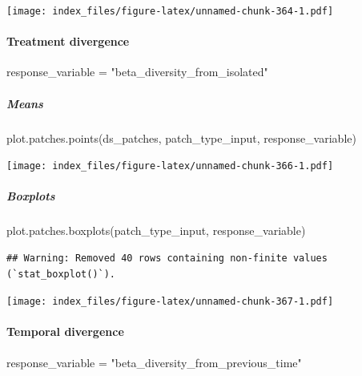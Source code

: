 \documentclass[
]{article}
\newenvironment{Shaded}{\begin{snugshade}}{\end{snugshade}}
\newcommand{\FunctionTok}[1]{\textcolor[rgb]{0.00,0.00,0.00}{#1}}
\newcommand{\NormalTok}[1]{#1}
\newcommand{\OtherTok}[1]{\textcolor[rgb]{0.56,0.35,0.01}{#1}}
\newcommand{\StringTok}[1]{\textcolor[rgb]{0.31,0.60,0.02}{#1}}
\begin{document}
\texttt{[image: index\_files/figure-latex/unnamed-chunk-364-1.pdf]}

\hypertarget{treatment-divergence-1}{%
\paragraph{Treatment divergence}\label{treatment-divergence-1}}

\begin{Shaded}
\begin{Highlighting}[]
\NormalTok{response\_variable }\OtherTok{=} \StringTok{"beta\_diversity\_from\_isolated"}
\end{Highlighting}
\end{Shaded}

\hypertarget{means-33}{%
\subparagraph{Means}\label{means-33}}

\begin{Shaded}
\begin{Highlighting}[]
\FunctionTok{plot.patches.points}\NormalTok{(ds\_patches, patch\_type\_input,}
\NormalTok{                    response\_variable)}
\end{Highlighting}
\end{Shaded}

\texttt{[image: index\_files/figure-latex/unnamed-chunk-366-1.pdf]}

\hypertarget{boxplots-31}{%
\subparagraph{Boxplots}\label{boxplots-31}}

\begin{Shaded}
\begin{Highlighting}[]
\FunctionTok{plot.patches.boxplots}\NormalTok{(patch\_type\_input,}
\NormalTok{                      response\_variable)}
\end{Highlighting}
\end{Shaded}

\begin{verbatim}
## Warning: Removed 40 rows containing non-finite values (`stat_boxplot()`).
\end{verbatim}

\texttt{[image: index\_files/figure-latex/unnamed-chunk-367-1.pdf]}

\hypertarget{temporal-divergence-1}{%
\paragraph{Temporal divergence}\label{temporal-divergence-1}}

\begin{Shaded}
\begin{Highlighting}[]
\NormalTok{response\_variable }\OtherTok{=} \StringTok{"beta\_diversity\_from\_previous\_time"}
\end{Highlighting}
\end{Shaded}
\end{document}
